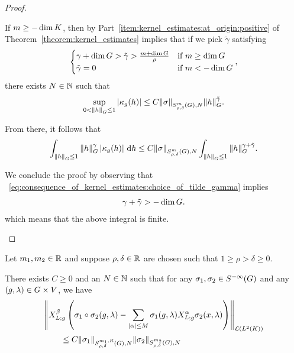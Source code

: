 \begin{proof}
\begin{description}
            If $m \geq -\dim \CompactGroup$,
            then by Part~\eqref{item:kernel_estimates:at_origin:positive} of Theorem~\ref{theorem:kernel_estimates} implies
            that if we pick $\tilde \gamma$ satisfying
            \begin{align}
                \begin{cases}
                    \gamma + \dim \Group > \tilde \gamma > \frac {m + \dim \Group} \rho & \text{if } m \geq \dim \Group\\
                    \tilde \gamma = 0 & \text{if } m < -\dim \Group
                \end{cases},
                \label{eq:consequence_of_kernel_estimates:choice_of_tilde_gamma}
            \end{align}
            there exists $N \in \N$ such that
            \begin{align*}
                \sup_{0 < \norm [\Group] h \leq 1} \abs{\kappa_g(h)}
                \leq
                    C \SymbolSemiNorm m {\rho, \delta} N \sigma \norm [\Group] h^{\tilde \gamma}.
            \end{align*}

            From there, it follows that
            \begin{align*}
                \int_{\norm [\Group] h \leq 1} \norm [\Group] h^\gamma \abs {\kappa_g(h)} \dd h \leq
                C \SymbolSemiNorm m {\rho, \delta} N \sigma
                \int_{\norm [\Group] h \leq 1}
                \norm [\Group] h^{\gamma + \tilde \gamma}.
            \end{align*}

            We conclude the proof by observing that ~\eqref{eq:consequence_of_kernel_estimates:choice_of_tilde_gamma}
            implies
            \begin{align*}
                \gamma + \tilde \gamma > -\dim \Group.
            \end{align*}
            which means that the above integral is finite.
    \end{description}
\end{proof}

\begin{lemma}
    Let $m_1, m_2 \in \R$ and suppose $\rho, \delta \in \R$ are chosen such that $1 \geq \rho > \delta \geq 0$.

    There exists $C \geq 0$ and an $N \in \N$ such that
    for any $\sigma_1, \sigma_2 \in \SmoothingSymbols$ and any $(g, \lambda) \in \Group \times \VectorSpace$,
    we have
    \begin{align*}
        &\norm [\Lin {\Lebesgue 2 \CompactGroup}] {%
            \LeftDifferentialOperator [g]  \beta \left(
                \sigma_1 \circ \sigma_2(g, \lambda)
                - \sum_{\abs \alpha \leq M} \sigma_1(g, \lambda) \LeftDifferentialOperator [g] \alpha \sigma_2(x, \lambda)
            \right)
        }\\
        &\qquad \leq C \SymbolSemiNorm {m_1, R} {\rho, \delta} N {\sigma_1} \SymbolSemiNorm {m_2} {\rho, \delta} N {\sigma_2}
    \end{align*}
\end{lemma}

